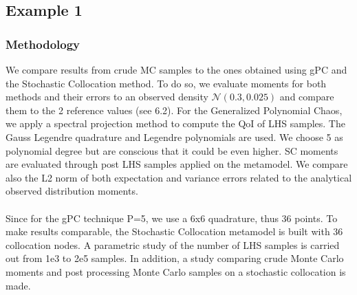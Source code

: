 \documentclass[11pt, a4paper, English]{report}
\begin{document}
\subsection{Example 1}
\subsubsection{Methodology}
We compare results from crude MC samples to the ones obtained using gPC and the Stochastic Collocation method. To do so, we evaluate moments for both methods and their errors to an observed density $\mathcal{N}(0.3, 0.025)$ and compare them to the 2 reference values (see 6.2). For the Generalized Polynomial Chaos, we apply a spectral projection method to compute the QoI of LHS samples. The Gauss Legendre quadrature and Legendre polynomials are used. We choose 5 as polynomial degree but are conscious that it could be even higher. SC moments are evaluated through post LHS samples applied on the metamodel. We compare also the L2 norm of both expectation and variance errors related to the analytical observed distribution moments. \\\\
Since for the gPC technique P=5, we use a 6x6 quadrature, thus 36 points. To make results comparable, the Stochastic Collocation metamodel is built with 36 collocation nodes. A parametric study of the number of LHS samples is carried out from 1e3 to 2e5 samples. In addition, a study comparing crude Monte Carlo moments and post processing Monte Carlo samples on a stochastic collocation is made.
\end{document}
